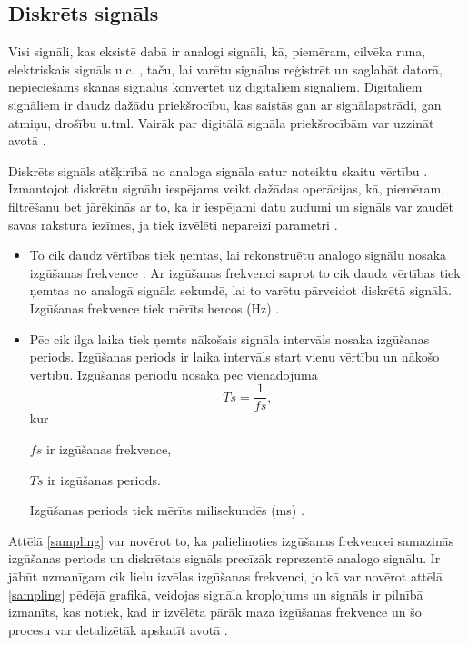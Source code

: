 \documentclass[12pt,paper=A4]{report}
\begin{document}
\subsection{Diskrēts signāls}
\sloppy

Visi signāli, kas eksistē dabā ir analogi signāli, kā, piemēram, cilvēka runa, elektriskais signāls u.c. \cite{nature}, taču, lai varētu signālus reģistrēt un saglabāt datorā, nepieciešams skaņas signālus konvertēt uz digitāliem signāliem. Digitāliem signāliem ir daudz dažādu priekšrocību, kas saistās gan ar signālapstrādi, gan atmiņu, drošību u.tml. Vairāk par digitālā signāla priekšrocībām var uzzināt avotā \cite{adv}.  

Diskrēts signāls atšķirībā no analoga signāla satur noteiktu skaitu vērtību \cite{DiscreteSignal}. Izmantojot diskrētu signālu iespējams veikt dažādas operācijas, kā, piemēram, filtrēšanu bet jārēķinās ar to, ka ir iespējami datu zudumi un signāls var zaudēt savas rakstura iezīmes, ja tiek izvēlēti nepareizi parametri \cite{AnalogandDigitalSignal}.

\begin{itemize}

\item To cik daudz vērtības tiek ņemtas, lai rekonstruētu analogo signālu nosaka izgūšanas frekvence \cite{AnalogandDigitalSignal}. Ar izgūšanas frekvenci saprot to cik daudz vērtības tiek ņemtas no analogā signāla sekundē, lai to varētu pārveidot diskrētā signālā. Izgūšanas frekvence tiek mērīts hercos (Hz) \cite{http://www.digitizationguidelines.gov/term.php?term=samplingrateaudio}.

\item Pēc cik ilga laika tiek ņemts nākošais signāla intervāls nosaka izgūšanas periods. Izgūšanas periods ir laika intervāls start vienu vērtību un nākošo vērtību. Izgūšanas periodu nosaka pēc vienādojuma
\begin{equation}
Ts= \frac{1}{fs},
\end{equation}
kur 

$fs$ ir izgūšanas frekvence, 

$Ts$ ir izgūšanas periods. 

Izgūšanas periods tiek mērīts milisekundēs (ms) \cite{Sampling} . 

\end{itemize}

Attēlā \ref{sampling} var novērot to, ka palielinoties izgūšanas frekvencei samazinās izgūšanas periods un diskrētais signāls precīzāk reprezentē analogo signālu. Ir jābūt uzmanīgam cik lielu izvēlas izgūšanas frekvenci, jo kā var novērot attēlā \ref{sampling}  pēdējā grafikā, veidojas signāla kropļojums un signāls ir pilnībā izmanīts, kas notiek, kad ir izvēlēta pārāk maza izgūšanas frekvence un šo procesu var detalizētāk apskatīt avotā \cite{dtw52}.  
\FloatBarrier
\end{document}
